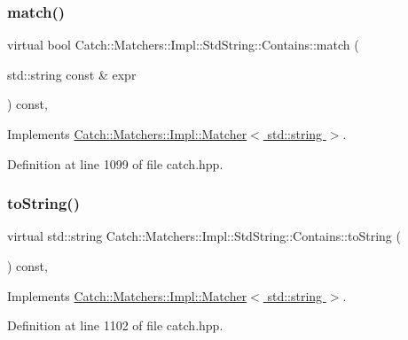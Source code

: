 \subsubsection{\texorpdfstring{match()}{match()}}
{\footnotesize\ttfamily virtual bool Catch\+::\+Matchers\+::\+Impl\+::\+Std\+String\+::\+Contains\+::match (\begin{DoxyParamCaption}\item[{std\+::string const \&}]{expr }\end{DoxyParamCaption}) const\hspace{0.3cm}{\ttfamily [inline]}, {\ttfamily [virtual]}}



Implements \hyperlink{struct_catch_1_1_matchers_1_1_impl_1_1_matcher_a8c1c5511ce1f3738a45e6901b558f583}{Catch\+::\+Matchers\+::\+Impl\+::\+Matcher$<$ std\+::string $>$}.



Definition at line 1099 of file catch.\+hpp.

\hypertarget{struct_catch_1_1_matchers_1_1_impl_1_1_std_string_1_1_contains_aed168ddff5bce9295aec5c7daca89849}{}\label{struct_catch_1_1_matchers_1_1_impl_1_1_std_string_1_1_contains_aed168ddff5bce9295aec5c7daca89849} 
\subsubsection{\texorpdfstring{to\+String()}{toString()}}
{\footnotesize\ttfamily virtual std\+::string Catch\+::\+Matchers\+::\+Impl\+::\+Std\+String\+::\+Contains\+::to\+String (\begin{DoxyParamCaption}{ }\end{DoxyParamCaption}) const\hspace{0.3cm}{\ttfamily [inline]}, {\ttfamily [virtual]}}



Implements \hyperlink{struct_catch_1_1_matchers_1_1_impl_1_1_matcher_a091bcc37e589967d7e10fc7790d820e2}{Catch\+::\+Matchers\+::\+Impl\+::\+Matcher$<$ std\+::string $>$}.



Definition at line 1102 of file catch.\+hpp.



